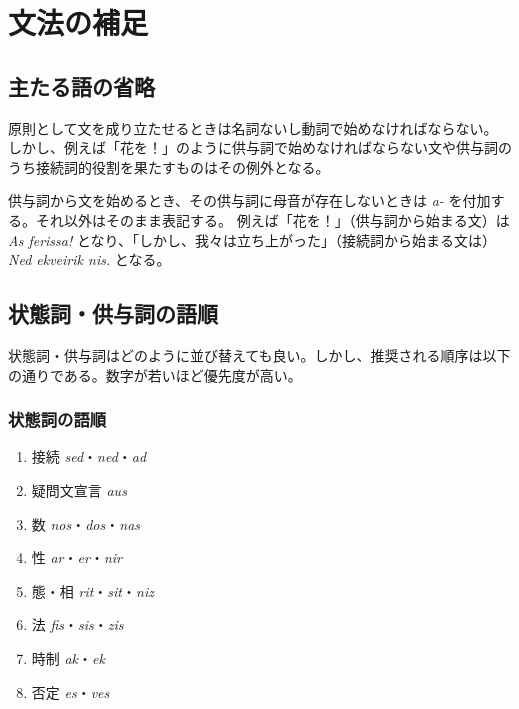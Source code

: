\chapter{文法の補足}

\section{主たる語の省略}

原則として文を成り立たせるときは名詞ないし動詞で始めなければならない。
しかし、例えば「花を！」のように供与詞で始めなければならない文や供与詞のうち接続詞的役割を果たすものはその例外となる。

供与詞から文を始めるとき、その供与詞に母音が存在しないときは \emph{a-} を付加する。それ以外はそのまま表記する。
例えば「花を！」（供与詞から始まる文）は \emph{As ferissa!} となり、「しかし、我々は立ち上がった」（接続詞から始まる文は）\emph{Ned ekveirik nis.} となる。

\section{状態詞・供与詞の語順}

状態詞・供与詞はどのように並び替えても良い。しかし、推奨される順序は以下の通りである。数字が若いほど優先度が高い。

\subsection{状態詞の語順}

\begin{multicols}{2}
    \begin{enumerate}
        \item 接続 \emph{sed}・\emph{ned}・\emph{ad}
        \item 疑問文宣言 \emph{aus}
        \item 数 \emph{nos}・\emph{dos}・\emph{nas}
        \item 性 \emph{ar}・\emph{er}・\emph{nir}
        \columnbreak
        \item 態・相 \emph{rit}・\emph{sit}・\emph{niz}
        \item 法 \emph{fis}・\emph{sis}・\emph{zis}
        \item 時制 \emph{ak}・\emph{ek}
        \item 否定 \emph{es}・\emph{ves}
    \end{enumerate}
\end{multicols}

